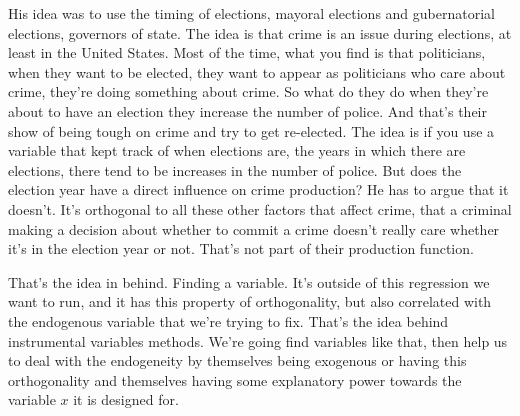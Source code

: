 \documentclass[11pt,a4paper]{amsart}
\theoremstyle{plain}
\theoremstyle{definition}
\begin{document}
 		 His idea was to use the timing of elections, mayoral elections and gubernatorial elections, governors of state. The idea is that crime is an issue during elections, at least in the United States. Most of the time, what you find is that politicians, when they want to be elected, they want to appear as politicians who care about crime, they're doing something about crime. So what do they do when they're about to have an election they increase the number of police. And that's their show of being tough on crime and try to get re-elected. The idea is if you use a variable that kept track of when elections are, the years in which there are elections, there tend to be increases in the number of police. But does the election year have a direct influence on crime production? He has to argue that it doesn't. It's orthogonal to all these other factors that affect crime, that a criminal making a decision about whether to commit a crime doesn't really care whether it's in the election year or not. That's not part of their production function. \par 
 		 That's the idea in behind. Finding a variable. It's outside of this regression we want to run, and it has this property of orthogonality, but also correlated with the endogenous variable that we're trying to fix. That's the idea behind instrumental variables methods. We're going find variables like that, then help us to deal with the endogeneity by themselves being exogenous or having this orthogonality and  themselves having some explanatory power towards the variable $x$ it is designed for.
\end{document}
